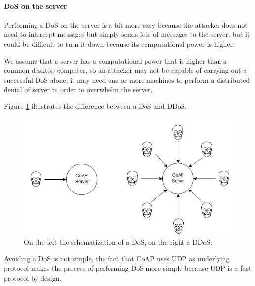 	\paragraph{DoS on the server}
	Performing a DoS on the server is a bit more easy because the attacker does not need to intercept messages but simply sends lots of messages to the server, but it could be difficult to turn it down because its computational power is higher.\newline
	
	We assume that a server has a computational power that is higher than a common desktop computer, so an attacker may not be capable of carrying out a successful DoS alone, it may need one or more machines to perform a distributed denial of server in order to overwhelm the server.\newline
	
	Figure \ref{fig:coap-vuln1} illustrates the difference between a DoS and DDoS.
	
	\begin{figure}
		\includegraphics[width=\linewidth]{coap-vuln-img1.png}
		\caption{On the left the schematization of a DoS, on the right a DDoS.}
		\label{fig:coap-vuln1}
	\end{figure}

	Avoiding a DoS is not simple, the fact that CoAP uses UDP as underlying protocol makes the process of performing DoS more simple because UDP is a fast protocol by design.\newline
	
